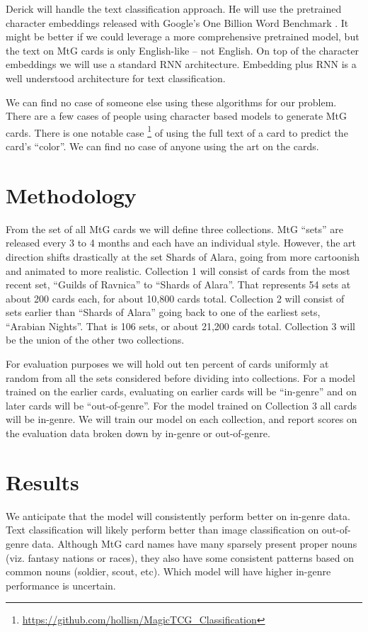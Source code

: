 \documentclass{article}
\begin{document}
Derick will handle the text classification approach.
He will use the pretrained character embeddings
released with Google's One Billion Word Benchmark
\cite{one-billion-words}.
It might be better if we could leverage a more comprehensive pretrained model,
but the text on MtG cards is only English-like -- not English.
On top of the character embeddings
we will use a standard RNN architecture.
Embedding plus RNN is a well understood architecture for text classification.

We can find no case of someone else using these algorithms for our problem.
There are a few cases of people using character based models
to generate MtG cards.
There is one notable case
\footnote{\url{https://github.com/hollisn/MagicTCG_Classification}}
of using the full text of a card to predict the card's ``color''.
We can find no case of anyone using the art on the cards.

\section*{Methodology}

From the set of all MtG cards we will define three collections.
MtG ``sets'' are released every
3 to 4 months and each have an individual style.
However,
the art direction shifts drastically at the set Shards of Alara,
going from more cartoonish and animated to more realistic.
Collection 1 will consist of cards from the most recent set,
``Guilds of Ravnica'' to ``Shards of Alara''.
That represents 54 sets at about 200 cards each,
for about 10,800 cards total.
Collection 2 will consist of sets earlier than ``Shards of Alara''
going back to one of the earliest sets, ``Arabian Nights''.
That is 106 sets, or about 21,200 cards total.
Collection 3 will be the union of the other two collections.

For evaluation purposes
we will hold out ten percent of cards uniformly at random
from all the sets considered
before dividing into collections.
For a model trained on the earlier cards,
evaluating on earlier cards will be ``in-genre''
and on later cards will be ``out-of-genre''.
For the model trained on Collection 3
all cards will be in-genre.
We will train our model on each collection,
and report scores on the evaluation data
broken down by in-genre or out-of-genre.

\section*{Results}

We anticipate that the model will
consistently perform better on in-genre data.
Text classification
will likely perform better than image classification
on out-of-genre data.
Although MtG card names have many sparsely present proper nouns
(viz. fantasy nations or races),
they also have some consistent patterns based on common nouns
(soldier, scout, etc).
Which model will have higher in-genre performance is uncertain.


{}

\end{document}
